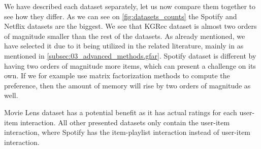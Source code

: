 We have described each dataset separately, let us now compare them together to see how they differ. As we can see on \ref{fig:datasets_counts} the Spotify and Netflix datasets are the biggest. We see that KGRec dataset is almost two orders of magnitude smaller than the rest of the datasets. As already mentioned, we have selected it due to it being utilized in the related literature, mainly in \cite{GFAR-kaya2020} as mentioned in \ref{subsec:03_advanced_methods.gfar}. Spotify dataset is different by having two orders of magnitude more items, which can present a challenge on its own. If we for example use matrix factorization methods to compute the preference, then the amount of memory will rise by two orders of magnitude as well.

Movie Lens dataset has a potential benefit as it has actual ratings for each user-item interaction. All other presented datasets only contain the user-item interaction, where Spotify has the item-playlist interaction instead of user-item interaction.

